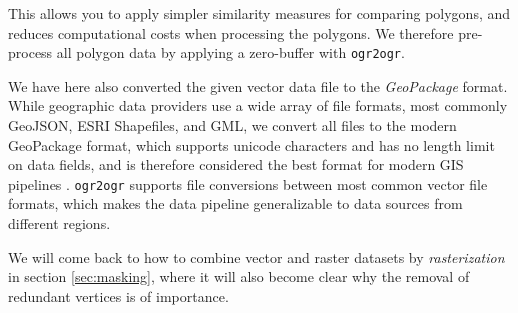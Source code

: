 This allows you to apply simpler similarity measures for comparing polygons, and reduces computational costs when processing the polygons.
We therefore pre-process all polygon data by applying a zero-buffer with \texttt{ogr2ogr}.


We have here also converted the given vector data file to the \textit{GeoPackage} format.
While geographic data providers use a wide array of file formats, most commonly GeoJSON, ESRI Shapefiles, and GML, we convert all files to the modern GeoPackage format, which supports unicode characters and has no length limit on data fields, and is therefore considered the best format for modern GIS pipelines \cite{hame_shapefile_2019}.
\texttt{ogr2ogr} supports file conversions between most common vector file formats, which makes the data pipeline generalizable to data sources from different regions.

We will come back to how to combine vector and raster datasets by \textit{rasterization} in section \ref{sec:masking}, where it will also become clear why the removal of redundant vertices is of importance.
